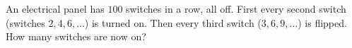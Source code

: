 An electrical panel has $100$ switches in a row, all off. First every second switch (switches $2,4,6,\dots$) is turned on. Then every third switch ($3,6,9,\dots$) is flipped. How many switches are now on?
